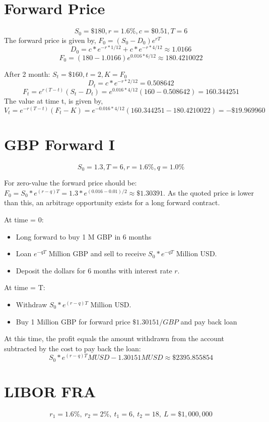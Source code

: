 \documentclass{article}
\begin{document}
\thispagestyle{fancy}


\section{Forward Price}

$$S_0 = \$180, r = 1.6\%, c = \$0.51, T = 6$$
The forward price is given by, $F_0 = (S_0 - D_0)e^{rT}$
$$D_0 = c*e^{-r * 1/12} + c*e^{-r * 4/12} \approx 1.0166 $$
$$F_0 = (180 - 1.0166)e^{0.016 * 6/12} \approx 180.4210022$$

After 2 month: $S_t = \$160, t=2, K=F_0$
$$D_t = c * e^{-r * 2/12} = 0.508642$$
$$F_t = e^{r(T-t)}(S_t - D_t) = e^{0.016 * 4/12}(160-0.508642) = 160.344251$$
The value at time t, is given by,
$$V_t = e^{-r(T-t)}(F_t - K) = e^{-0.016 * 4/12}(160.344251-180.4210022) = -\$19.969960$$

\section{GBP Forward I}

$$S_0 = 1.3, T=6, r = 1.6\%, q = 1.0\%$$

For zero-value the forward price should be: $F_0 = S_0*e^{(r-q)T} = 1.3 * e^{(0.016-0.01)/2} \approx \$1.30391 $. As the quoted price is lower than this, an arbitrage opportunity exists for a long forward contract.

At time = 0: 
\begin{itemize}
	\item Long forward to buy 1 M GBP in 6 months
	\item Loan $e^{-qT}$ Million GBP and sell to receive $S_0*e^{-qT}$ Million USD.
	\item Deposit the dollars for 6 months with interest rate $r$.
\end{itemize}

At time = T: 
\begin{itemize}
	\item Withdraw $S_0 * e^{(r-q)T}$ Million USD.
	\item Buy 1 Million GBP for forward price $\$1.30151/GBP$ and pay back loan
\end{itemize}
At this time, the profit equals the amount withdrawn from the account subtracted by the cost to pay back the loan:
$$ S_0 * e^{(r-q)T} MUSD - 1.30151 MUSD \approx \$2395.855854$$

\section{LIBOR FRA}
$$r_1 = 1.6\%, \ r_2 = 2\%, \ t_1 = 6, \ t_2 = 18, \ L = \$1,000,000$$
\end{document}
